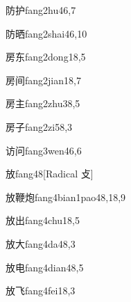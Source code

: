 \begin{entry}{防护}{fang2hu4}{6,7}
\end{entry}

\begin{entry}{防晒}{fang2shai4}{6,10}
\end{entry}

\begin{entry}{房东}{fang2dong1}{8,5}
\end{entry}

\begin{entry}{房间}{fang2jian1}{8,7}
\end{entry}

\begin{entry}{房主}{fang2zhu3}{8,5}
\end{entry}

\begin{entry}{房子}{fang2zi5}{8,3}
\end{entry}

\begin{entry}{访问}{fang3wen4}{6,6}
\end{entry}

\begin{entry}{放}{fang4}{8}[Radical 攴]
\end{entry}

\begin{entry}{放鞭炮}{fang4bian1pao4}{8,18,9}
\end{entry}

\begin{entry}{放出}{fang4chu1}{8,5}
\end{entry}

\begin{entry}{放大}{fang4da4}{8,3}
\end{entry}

\begin{entry}{放电}{fang4dian4}{8,5}
\end{entry}

\begin{entry}{放飞}{fang4fei1}{8,3}
\end{entry}

